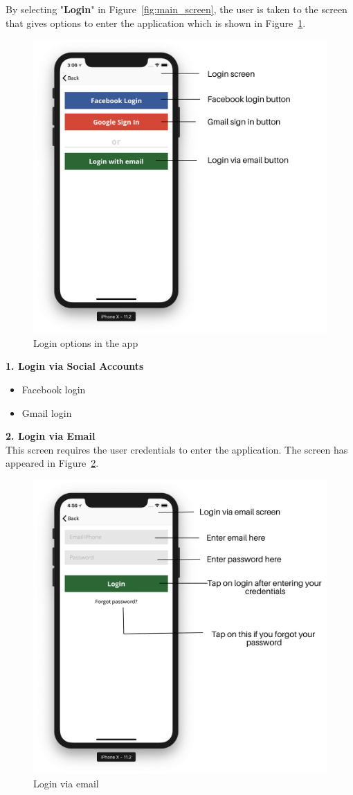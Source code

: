 \begin{itemize}
    
    By selecting "\textbf{Login}" in Figure~\ref{fig:main_screen}, the user is taken to the screen that gives options to enter the application which is shown in Figure~\ref{fig:loginOptions}.
    
    \begin{figure}[H]
            \centering
            \includegraphics[width=0.50\linewidth]{figures/ch2/loginOptions.png}
            \caption{\label{fig:loginOptions} Login options in the app}
    \end{figure}
    
     \textbf{1. Login via Social Accounts}
     \begin{itemize}
         \item Facebook login
         \item Gmail login
     \end{itemize}
   
     \textbf{2. Login via Email} \\
    This screen requires the user credentials to enter the application. The screen has appeared in Figure~\ref{fig:login_email}.
     
     \begin{figure}[H]
            \centering
            \includegraphics[width=0.50\linewidth]{figures/ch2/login_email.png}
            \caption{\label{fig:login_email} Login via email}
    \end{figure}
    

\end{itemize}

